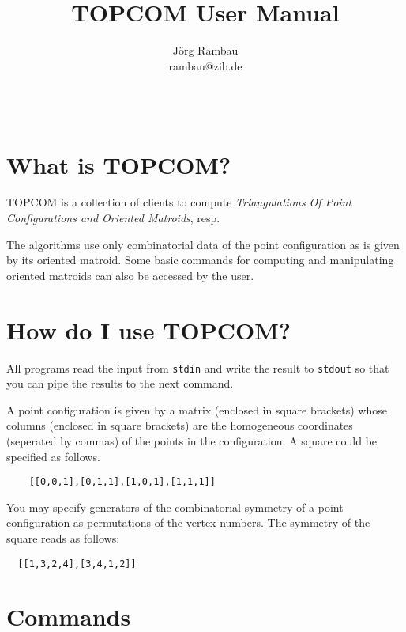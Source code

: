 \documentclass[12pt,a4paper]{article}
\title{TOPCOM User Manual}
\author{J\"org Rambau\\
  rambau@zib.de}
\begin{document}
\maketitle

\begin{verbatim}
\end{verbatim}


\section{What is TOPCOM?}
\label{sec:whatis}

TOPCOM is a collection of clients to compute \emph{Triangulations Of Point
Configurations and Oriented Matroids}, resp.

The algorithms use only combinatorial data of the point configuration as is
given by its oriented matroid.  Some basic commands for computing and
manipulating oriented matroids can also be accessed by the user.


\section{How do I use TOPCOM?}
\label{sec:howto}

All programs read the input from \texttt{stdin} and write the result to
\texttt{stdout} so that you can pipe the results to the next command.

A point configuration is given by a matrix (enclosed in square brackets) whose
columns (enclosed in square brackets) are the homogeneous coordinates
(seperated by commas) of the points in the configuration.  A square could be
specified as follows.

\begin{verbatim}
    [[0,0,1],[0,1,1],[1,0,1],[1,1,1]]
\end{verbatim}

You may specify generators of the combinatorial symmetry of a point
configuration as permutations of the vertex numbers. The symmetry of the square
reads as follows:

\begin{verbatim}
  [[1,3,2,4],[3,4,1,2]]
\end{verbatim}

\section{Commands}
\label{sec:commands}
\end{document}
